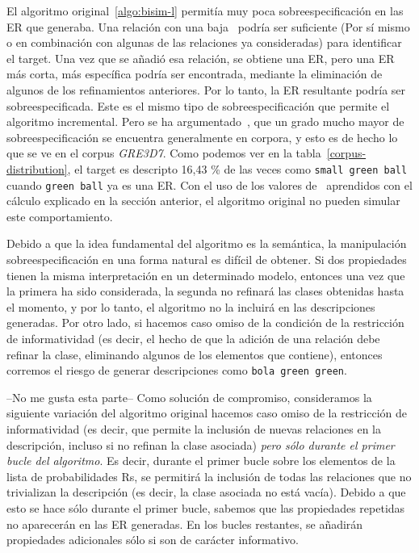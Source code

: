 El algoritmo original~\ref{algo:bisim-l}
 permit\'ia muy poca sobreespecificaci\'on en las ER que
generaba. Una relaci\'on con una baja \puse\ podr\'{i}a ser suficiente
(Por s\'{i} mismo o en combinaci\'on con algunas de las relaciones ya consideradas) para
identificar el target. Una vez que se a\~nadi\'o esa relaci\'on, se obtiene una ER, pero una ER m\'as corta, m\'as espec\'{i}fica podr\'{i}a ser encontrada, mediante la eliminaci\'on de algunos de los refinamientos anteriores.
Por lo tanto, la ER resultante podr\'{i}a ser sobreespecificada. Este es el mismo tipo de sobreespecificaci\'on
que permite el algoritmo incremental. Pero se ha argumentado~\cite{Engelhardt_Bailey_Ferreira_2006}, \cite{Arts_Maes_Noordman_Jansen_2011} que
un grado mucho mayor de sobreespecificaci\'on se encuentra generalmente en corpora, y esto
es de hecho lo que se ve en el corpus \textit{GRE3D7}. Como podemos ver en la tabla~\ref{corpus-distribution},
el target es descripto 16,43 \% de las veces como \texttt{small green ball} cuando \texttt{green ball} ya es una ER. Con el uso de los valores de \puse\ aprendidos con el c\'alculo explicado en la secci\'on anterior, el algoritmo original no pueden simular este comportamiento.

Debido a que la idea fundamental del algoritmo es la sem\'antica, la manipulaci\'on sobreespecificaci\'on en
una forma natural es dif\'{i}cil de obtener. Si dos propiedades tienen la misma interpretaci\'on en un determinado
modelo, entonces una vez que la primera ha sido considerada, la segunda no refinar\'a las clases
obtenidas hasta el momento, y por lo tanto, el algoritmo no la incluir\'a en las descripciones generadas.
Por otro lado, si hacemos caso omiso de la condici\'on de la restricci\'on de informatividad (es decir,
el hecho de que la adici\'on de una relaci\'on debe refinar la clase, eliminando algunos de
los elementos que contiene), entonces corremos el riesgo de generar descripciones como \texttt{bola green green}.

--No me gusta esta parte--
Como soluci\'on de compromiso, consideramos la siguiente variaci\'on del algoritmo
original %
hacemos caso omiso de la restricci\'on de informatividad (es decir, que permite la inclusi\'on de nuevas relaciones
en la descripci\'on, incluso si no refinan la clase asociada) \emph{pero s\'olo durante el
primer bucle del algoritmo}. Es decir, durante el primer bucle sobre los elementos de la
lista de probabilidades Rs, se permitir\'a la inclusi\'on de todas las relaciones que no trivializan la
descripci\'on (es decir, la clase asociada no est\'a vac\'{i}a). Debido a que esto se hace s\'olo durante
el primer bucle, sabemos que las propiedades repetidas no aparecer\'an en las ER generadas.
En los bucles restantes, se a\~nadir\'an propiedades adicionales s\'olo si son de car\'acter informativo.\\


